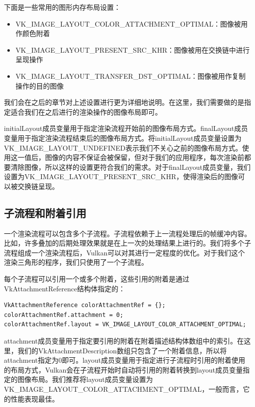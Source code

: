 \documentclass{ctexart}
\begin{document}
下面是一些常用的图形内存布局设置：

\begin{itemize}
	\item VK\_IMAGE\_LAYOUT\_COLOR\_ATTACHMENT\_OPTIMAL：图像被用作颜色附着
	\item VK\_IMAGE\_LAYOUT\_PRESENT\_SRC\_KHR：图像被用在交换链中进行呈现操作
	\item VK\_IMAGE\_LAYOUT\_TRANSFER\_DST\_OPTIMAL：图像被用作复制操作的目的图像
\end{itemize}

我们会在之后的章节对上述设置进行更为详细地说明。在这里，我们需要做的是指定适合我们在之后进行的渲染操作的图像布局即可。

initialLayout成员变量用于指定渲染流程开始前的图像布局方式。finalLayout成员变量用于指定渲染流程结束后的图像布局方式。将initialLayout成员变量设置为VK\_IMAGE\_LAYOUT\_UNDEFINED表示我们不关心之前的图像布局方式。使用这一值后，图像的内容不保证会被保留，但对于我们的应用程序，每次渲染前都要清除图像，所以这样的设置更符合我们的需求。对于finalLayout成员变量，我们设置为VK\_IMAGE\_LAYOUT\_PRESENT\_SRC\_KHR，使得渲染后的图像可以被交换链呈现。

\subsection{子流程和附着引用}

一个渲染流程可以包含多个子流程。子流程依赖于上一流程处理后的帧缓冲内容。比如，许多叠加的后期处理效果就是在上一次的处理结果上进行的。我们将多个子流程组成一个渲染流程后，Vulkan可以对其进行一定程度的优化。对于我们这个渲染三角形的程序，我们只使用了一个子流程。

每个子流程可以引用一个或多个附着，这些引用的附着是通过VkAttachmentReference结构体指定的：

\begin{lstlisting}[language={[ANSI]C}]
VkAttachmentReference colorAttachmentRef = {};
colorAttachmentRef.attachment = 0;
colorAttachmentRef.layout = VK_IMAGE_LAYOUT_COLOR_ATTACHMENT_OPTIMAL;
\end{lstlisting}

attachment成员变量用于指定要引用的附着在附着描述结构体数组中的索引。在这里，我们的VkAttachmentDescription数组只包含了一个附着信息，所以将attachment指定为0即可。layout成员变量用于指定进行子流程时引用的附着使用的布局方式，Vulkan会在子流程开始时自动将引用的附着转换到layout成员变量指定的图像布局。我们推荐将layout成员变量设置为VK\_IMAGE\_LAYOUT\_COLOR\_ATTACHMENT\_OPTIMAL，一般而言，它的性能表现最佳。
\end{document}
